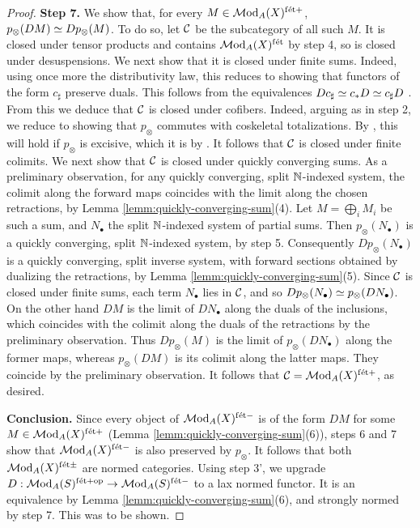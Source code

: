 \documentclass{amsart}
\numberwithin{proposition}{section}
\numberwithin{equation}{section}
\def\fet{\mathrm{f\acute et}}
\begin{document}
\begin{proof}
\textbf{Step 7.} We show that, for every $M \in  \Mod_A(X)^{\fet+}$, $p_\otimes(DM) \simeq Dp_\otimes(M)$.
To do so, let $\mathcal C$ be the subcategory of all such $M$.
It is closed under tensor products and contains $\Mod_A(X)^{\fet}$ by step 4, so is closed under desuspensions.
We next show that it is closed under finite sums.
Indeed, using once more the distributivity law, this reduces to showing that functors of the form $c_\sharp$ preserve duals.
This follows from the equivalences $Dc_\sharp \simeq c_* D \simeq c_\sharp D$ \cite[Theorem~2.4.50(2), (3), (5)]{triangulated-mixed-motives}.
From this we deduce that $\mathcal C$ is closed under cofibers.
Indeed, arguing as in step 2, we reduce to showing that $p_\otimes$ commutes with coskeletal totalizations.
By \cite[Proposition 2.15]{k-theory-and-poly-functors}, this will hold if $p_\otimes$ is excisive, which it is by \cite[Corollary 5.26]{bachmann-norms}.
It follows that $\mathcal C$ is closed under finite colimits.
We next show that $\mathcal C$ is closed under quickly converging sums.
As a preliminary observation, for any quickly converging, split $\mathbb{N}$-indexed system, the colimit along the forward maps coincides with the limit along the chosen retractions, by Lemma \ref{lemm:quickly-converging-sum}(4).
Let $M = \bigoplus_i M_i$ be such a sum, and $N_\bullet$ the split $\mathbb{N}$-indexed system of partial sums.
Then $p_\otimes(N_\bullet)$ is a quickly converging, split $\mathbb{N}$-indexed system, by step 5.
Consequently $Dp_\otimes(N_\bullet)$ is a quickly converging, split inverse system, with forward sections obtained by dualizing the retractions, by Lemma \ref{lemm:quickly-converging-sum}(5).
Since $\mathcal C$ is closed under finite sums, each term $N_\bullet$ lies in $\mathcal C$, and so $Dp_\otimes(N_\bullet) \simeq p_\otimes(DN_\bullet)$.
On the other hand $DM$ is the limit of $DN_\bullet$ along the duals of the inclusions, which coincides with the colimit along the duals of the retractions by the preliminary observation.
Thus $Dp_\otimes(M)$ is the limit of $p_\otimes(DN_\bullet)$ along the former maps, whereas $p_\otimes(DM)$ is its colimit along the latter maps.
They coincide by the preliminary observation.
It follows that $\scr C = \Mod_A(X)^{\fet+}$, as desired.

\textbf{Conclusion.}
Since every object of $\Mod_A(X)^{\fet-}$ is of the form $DM$ for some $M \in \Mod_A(X)^{\fet+}$ (Lemma \ref{lemm:quickly-converging-sum}(6)), steps 6 and 7 show that $\Mod_A(X)^{\fet-}$ is also preserved by $p_\otimes$.
It follows that both $\Mod_A(X)^{\fet\pm}$ are normed categories.
Using step 3', we upgrade $D: \Mod_A(S)^{\fet+\op} \to  \Mod_A(S)^{\fet-}$ to a lax normed functor.
It is an equivalence by Lemma \ref{lemm:quickly-converging-sum}(6), and strongly normed by step 7.
This was to be shown.
\end{proof}
\end{document}
